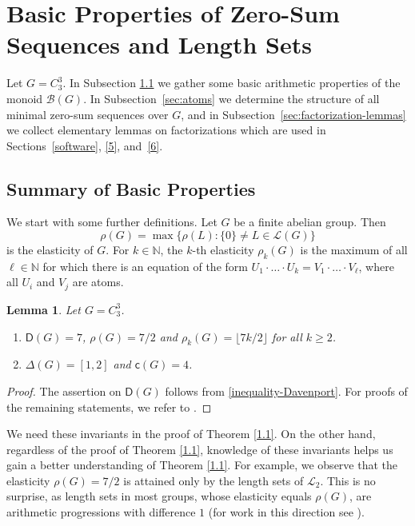 \documentclass[a4paper, 10pt]{amsart}
\theoremstyle{plain}
\newtheorem{lemma}[theorem]{\bf Lemma}
\theoremstyle{definition}
\theoremstyle{definition}
\newcommand{\N}{\mathbb N}
\numberwithin{equation}{section}
\begin{document}
\smallskip
\section{Basic  Properties of  Zero-Sum Sequences and Length Sets} \label{3}
\smallskip

Let $G=C_3^3$. 
In Subsection \ref{sec:basic} we gather some basic arithmetic properties of the monoid $\mathcal B (G)$.
In Subsection~\ref{sec:atoms} we determine the
structure of all minimal zero-sum sequences over $G$, and in
Subsection~\ref{sec:factorization-lemmas} we collect elementary lemmas on
factorizations  which are used in Sections~\ref{software}, \ref{5}, 
and~\ref{6}.


\subsection{Summary of Basic Properties} \label{sec:basic}
 We start with some further definitions. Let $G$ be a finite abelian group. Then
\[
\rho (G) = \max \{ \rho (L) \colon \{0\} \ne L \in \mathcal L (G)  \}
\]
is the elasticity of $G$. For $k \in \N$, the $k$-th elasticity $\rho_k (G)$ is the maximum of all $\ell \in \N$ for which there is an equation of the form $U_1 \cdot \ldots \cdot U_k = V_1 \cdot \ldots \cdot V_{\ell}$, where all $U_i$ and $V_j$ are atoms.


\begin{lemma} \label{lem:basic-properties}
Let $G = C_3^3$.
\begin{enumerate}
\item  $\mathsf D (G)=7$, $\rho (G)=7/2$ and  $\rho_k (G) = \lfloor 7 k /2 \rfloor$ for all $k \ge 2$.

\item $\Delta (G)  = [1,2]$ and $\mathsf c(G)=4$.
\end{enumerate}
\end{lemma}

\begin{proof}
The assertion on $\mathsf D (G)$ follows from \eqref{inequality-Davenport}. For proofs of the remaining statements, we refer to \cite[Corollaries 5.3.18 and 6.2.14]{Ge-Gr-Zh26a}.
\end{proof}

We need these invariants in the proof of Theorem \ref{1.1}. On the other hand, regardless of the proof of Theorem \ref{1.1}, knowledge of these invariants 
 helps us gain a better understanding of Theorem \ref{1.1}. For example, we observe that the  elasticity $\rho (G)=7/2$ is attained only by the length sets of $\mathcal L_2$. This is no surprise, as  length sets in most groups, whose elasticity equals $\rho (G)$, are arithmetic progressions with difference $1$ (for work in this direction see 
\cite{Ya26a}).
\end{document}
